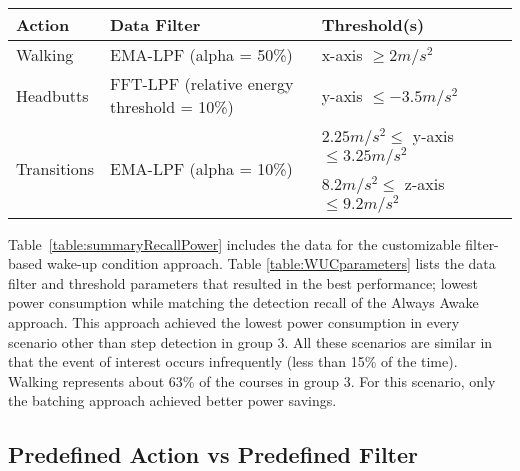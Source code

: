 \iffalse
Thus, for Duty Cycling with a sleep interval of 5 seconds, the time spent awake, asleep and transitioning is 44\%, 33\% and 22\% respectively. For Batching with a sleep interval of 5 seconds, the time spent awake, asleep and transitioning is 10\%, 50\% and 40\%, respectively. Therefore, for this sleep interval, Batching results in lower power consumption. 
\fi
\begin{table*}[t]
    \begin{tabular}{|l|l|l|l|}
	\hline
    Action      					& Data Filter 									& Threshold(s) \\ \hline
    Walking     					& EMA-LPF (alpha = 50\%) 						& x-axis $\geq 2 m/s^2$ 		\\ \hline
	Headbutts   					& FFT-LPF (relative energy threshold = 10\%) 	& y-axis $\leq -3.5 m/s^2$ 		\\ \hline
	\multirow{2}{*}{Transitions} 	& \multirow{2}{*}{EMA-LPF (alpha = 10\%)}		& $2.25 m/s^2 \leq$ y-axis $\leq 3.25 m/s^2$ 	\\ 
									&												& $8.2 m/s^2 \leq$ z-axis $\leq 9.2 m/s^2$ 	\\ \hline
    \end{tabular}
	\caption{Filter-based Wake-up Conditions parameters that achieved the lowest power consumption while matching detection recall of the Always Awake approach}
	\label{table:WUCparameters}
\end{table*}

Table~\ref{table:summaryRecallPower} includes the data for the customizable filter-based wake-up condition approach. Table \ref{table:WUCparameters} lists the data filter and threshold parameters that resulted in the best performance; lowest power consumption while matching the detection recall of the Always Awake approach. This approach achieved the lowest power consumption in every scenario other than step detection in group 3. All these scenarios are similar in that the event of interest occurs infrequently (less than 15\% of the time). Walking represents about 63\% of the courses in group 3. For this scenario, only the batching approach achieved better power savings.

\subsection{Predefined Action vs Predefined Filter}

